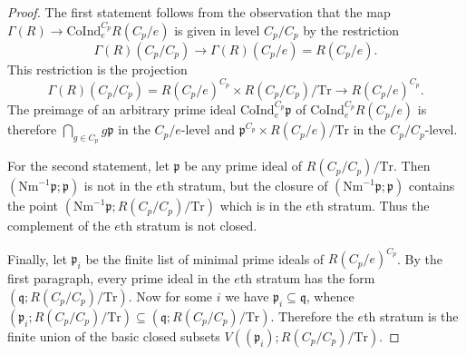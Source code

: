 \documentclass[10pt,a4paper]{amsart}
\newcommand{\Coind}{\mathrm{CoInd}}
\newcommand{\Nm}{\mathrm{Nm}}
\newcommand{\Tr}{\mathrm{Tr}}
\newcommand{\ghost}{\Gamma}
\newcommand{\p}{\mathfrak{p}}
\newcommand{\q}{\mathfrak{q}}
\renewcommand{\subset}{\subseteq}
\begin{document}
\begin{proof}
    The first statement follows from the observation that the map $\ghost(R) \rightarrow \Coind_e^{C_p} R(C_p/e)$ is given in level $C_p/C_p$ by the restriction 
    \[ 
        \ghost(R)(C_p/C_p) \rightarrow \ghost(R)(C_p/e) = R(C_p/e) . 
    \] 
    This restriction is the projection 
    \[ 
        \ghost(R)(C_p/C_p) = R(C_p/e)^{C_p} \times R(C_p/C_p)/\Tr \rightarrow R(C_p/e)^{C_p} . 
    \] 
    The preimage of an arbitrary prime ideal $\Coind_e^{C_p} \p$ of $\Coind_e^{C_p} R(C_p/e)$ is therefore $\bigcap_{g \in C_p} g \p$ in the $C_p/e$-level and $\p^{C_p} \times R(C_p/e)/\Tr$ in the $C_p/C_p$-level.

    For the second statement, let $\p$ be any prime ideal of $R(C_p/C_p)/\Tr$. Then $(\Nm^{-1}\p;\p)$ is not in the $e$th stratum, but the closure of $(\Nm^{-1}\p;\p)$ contains the point $(\Nm^{-1}\p;R(C_p/C_p)/\Tr)$ which is in the $e$th stratum. Thus the complement of the $e$th stratum is not closed.

    Finally, let $\p_i$ be the finite list of minimal prime ideals of $R(C_p/e)^{C_p}$. By the first paragraph, every prime ideal in the $e$th stratum has the form $(\q;R(C_p/C_p)/\Tr)$. Now for some $i$ we have $\p_i \subset \q$, whence $(\p_i;R(C_p/C_p)/\Tr) \subset (\q;R(C_p/C_p)/\Tr)$. Therefore the $e$th stratum is the finite union of the basic closed subsets $V((\p_i);R(C_p/C_p)/\Tr)$.
\end{proof}
\end{document}
